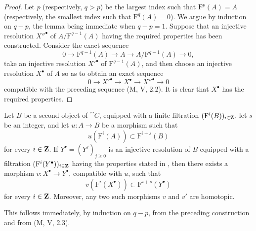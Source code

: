 \begin{proof}
Let $p$ (respectively, $q>p$) be the largest index such that
$\mathrm{F}^p(A)=A$ (respectively, the smallest index such that
$\mathrm{F}^q(A)=0$).
We argue by induction on $q-p$, the lemma being immediate when
$q-p=1$.
Suppose that an injective resolution ${X''}^\bullet$ of
$A/\mathrm{F}^{q-1}(A)$ having the required properties has been
constructed.
Consider the exact sequence
\[
  0\longrightarrow\mathrm{F}^{q-1}(A)
  \longrightarrow A
  \longrightarrow A/\mathrm{F}^{q-1}(A)
  \longrightarrow0,
\]
take an injective resolution ${X'}^\bullet$ of
$\mathrm{F}^{q-1}(A)$, and then choose an injective resolution
$X^\bullet$ of $A$ so as to obtain an exact sequence
\[
  0\longrightarrow {X'}^\bullet
  \longrightarrow X^\bullet
  \longrightarrow {X''}^\bullet
  \longrightarrow0
\]
compatible with the preceding sequence (M, V, 2.2).
It is clear that $X^\bullet$ has the required properties.
\end{proof}

\begin{corollary}[13.6.3]
\label{0.13.6.3}
Let $B$ be a second object of $\cat{C}$, equipped with a finite
filtration $(\mathrm{F}^i(B))_{i\in\mathbf{Z}}$, let $s$ be an integer,
and let $u:A\longrightarrow B$ be a morphism such that
\[
  u(\mathrm{F}^i(A))\subset\mathrm{F}^{i+s}(B)
\]
for every $i\in\mathbf{Z}$.
If $Y^\bullet=(Y^j)_{j\geq0}$ is an injective resolution of $B$
equipped with a filtration
$(\mathrm{F}^i(Y^\bullet))_{i\in\mathbf{Z}}$ having the properties stated
in , then there exists a morphism
$v:X^\bullet\longrightarrow Y^\bullet$, compatible with $u$, such
that
\[
  v(\mathrm{F}^i(X^\bullet))
  \subset
  \mathrm{F}^{i+s}(Y^\bullet)
\]
for every $i\in\mathbf{Z}$.
Moreover, any two such morphisms $v$ and $v'$ are homotopic.
\end{corollary}

This follows immediately, by induction on $q-p$, from the preceding
construction and from (M, V, 2.3).

